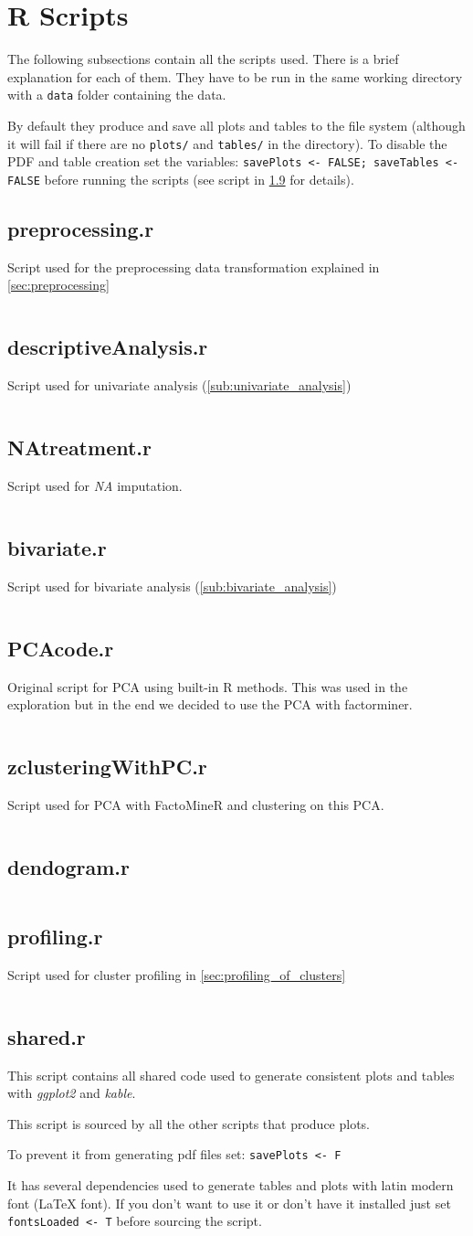 

\section{R Scripts}%
\label{sec:r_scripts}

The following subsections contain all the scripts used. There is a brief
explanation for each of them. They have to be run in the same working directory
with a \texttt{data} folder containing the data.

By default they produce and save all plots and tables to the file system
(although it will fail if there are no \texttt{plots/} and \texttt{tables/} in
the directory). To disable the PDF and table creation set the variables:
\texttt{savePlots <- FALSE; saveTables <- FALSE} before running the
scripts (see script in \cref{sub:shared.r} for details).

\newcommand{\mintedfile}[2]{
    \subsection{#1}%
    \label{sub:#1}
    #2
    \inputminted{r}{../../analysis/#1}
    \clearpage
}


\mintedfile{preprocessing.r}{
    Script used for the preprocessing data transformation explained in
    \cref{sec:preprocessing}
}
\mintedfile{descriptiveAnalysis.r}{
    Script used for univariate analysis (\cref{sub:univariate_analysis})
}
\mintedfile{NAtreatment.r}{
    Script used for \emph{NA} imputation.
}
\mintedfile{bivariate.r}{
    Script used for bivariate analysis (\cref{sub:bivariate_analysis})
}
\mintedfile{PCAcode.r}{
    Original script for PCA using built-in R methods. This was used in the exploration
    but in the end we decided to use the PCA with factorminer.
}
\mintedfile{zclusteringWithPC.r}{
    Script used for PCA with FactoMineR and clustering on this PCA.
}
\mintedfile{dendogram.r}{}
\mintedfile{profiling.r}{
    Script used for cluster profiling in \cref{sec:profiling_of_clusters}
}
\mintedfile{shared.r}{
    This script contains all shared code used to generate consistent plots and tables
    with \emph{ggplot2} and \emph{kable}.

    This script is sourced by all the other scripts that produce plots.

    To prevent it from generating pdf files set: \texttt{savePlots <- F}

    It has several dependencies used to generate tables and plots with latin
    modern font (\LaTeX{} font). If you don't want to use it or don't have it installed
    just set \texttt{fontsLoaded <- T} before sourcing the script.

}
